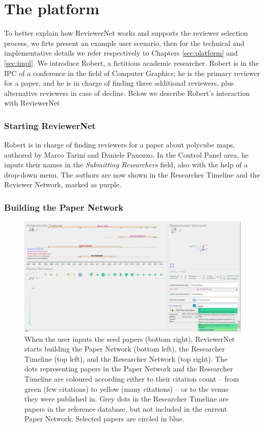 \chapter{The platform}\label{sec:demonstration}
To better explain how ReviewerNet works and supports the reviewer selection process, we firts present an example user scenario, then for the technical and implementative details we refer respectively to Chapters \ref{sec:platform} and \ref{sec:impl}.
We introduce Robert, a fictitious academic researcher. Robert is in the IPC of a conference in the field of Computer Graphics; he is the primary reviewer for a paper, and he is in charge of finding three additional reviewers, plus alternative reviewers in case of decline. 
Below we describe Robert's interaction with ReviewerNet
\subsection*{Starting ReviewerNet}

Robert is in charge of finding reviewers for a paper about polycube maps, authored by Marco Tarini and Daniele Panozzo. In the Control Panel area, he inputs their names in the \emph{Submitting Researchers} field, also with the help of a drop-down menu. The authors are now shown in the Researcher Timeline and the Reviewer Network, marked as purple. 
\subsection*{Building the Paper Network} 

\begin{figure}[!ht]
    \centering
    \includegraphics[width=\textwidth]{fig/insertion_manual.png}		
    \caption{When the user inputs the seed papers (bottom right), ReviewerNet starts building the Paper Network (bottom left), the Researcher Timeline (top left), and the Researcher Network (top right). The dots representing papers in the Paper Network and the Researcher Timeline are coloured according {either to their citation count -- from green (few citations) to yellow (many citations) -- or to the venue they were published in}. Grey dots in the Researcher Timeline are papers in the reference database, but not included in the current Paper Network. Selected papers are circled in blue.}%
    \label{fig:keypapers}
\end{figure}

